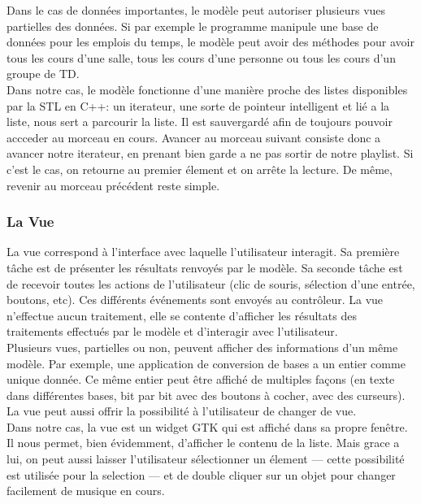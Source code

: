 \documentclass[12pt,a4paper]{report}
\begin{document}
Dans le cas de données importantes, le modèle peut autoriser plusieurs vues partielles des données. Si par exemple le programme manipule une base de données pour les emplois du temps, le modèle peut avoir des méthodes pour avoir tous les cours d'une salle, tous les cours d'une personne ou tous les cours d'un groupe de TD.\\

Dans notre cas, le modèle fonctionne d'une manière proche des listes disponibles par la STL en C++: un iterateur, une sorte de pointeur intelligent et lié a la liste, nous sert a parcourir la liste. Il est sauvergardé afin de toujours pouvoir accceder au morceau en cours. Avancer au morceau suivant consiste donc a avancer notre iterateur, en prenant bien garde a ne pas sortir de notre playlist. Si c'est le cas, on retourne au premier élement et on arrête la lecture. De même, revenir au morceau précédent reste simple.\\

\subsubsection{La Vue}

La vue correspond à l'interface avec laquelle l'utilisateur interagit. Sa première tâche est de présenter les résultats renvoyés par le modèle. Sa seconde tâche est de recevoir toutes les actions de l'utilisateur (clic de souris, sélection d'une entrée, boutons, etc). Ces différents événements sont envoyés au contrôleur. La vue n'effectue aucun traitement, elle se contente d'afficher les résultats des traitements effectués par le modèle et d'interagir avec l'utilisateur.\\

Plusieurs vues, partielles ou non, peuvent afficher des informations d'un même modèle. Par exemple, une application de conversion de bases a un entier comme unique donnée. Ce même entier peut être affiché de multiples façons (en texte dans différentes bases, bit par bit avec des boutons à cocher, avec des curseurs). La vue peut aussi offrir la possibilité à l'utilisateur de changer de vue.\\

Dans notre cas, la vue est un widget GTK qui est affiché dans sa propre fenêtre. Il nous permet, bien évidemment, d'afficher le contenu de la liste. Mais grace a lui, on peut aussi laisser l'utilisateur sélectionner un élement --- cette possibilité est utilisée pour la selection --- et de double cliquer sur un objet pour changer facilement de musique en cours.\\
\end{document}
